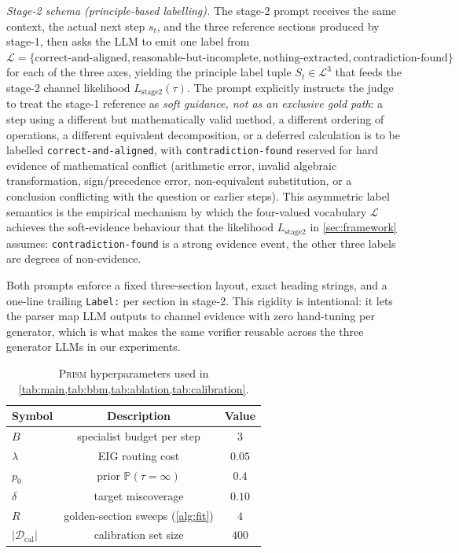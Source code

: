 \documentclass[11pt,a4paper]{article}
\newcommand{\Prob}{\mathbb{P}}
\newcommand{\Lcal}{\mathcal{L}}
\newcommand{\Dcal}{\mathcal{D}}
\theoremstyle{plain}
\theoremstyle{definition}
\theoremstyle{remark}
\begin{document}
\emph{Stage-2 schema (principle-based labelling).} The stage-2
prompt receives the same context, the actual next step $s_t$, and
the three reference sections produced by stage-1, then asks the LLM
to emit one label from
$\Lcal = \{\text{correct-and-aligned},
\text{reasonable-but-incomplete}, \text{nothing-extracted},
\text{contradiction-found}\}$
for each of the three axes, yielding the principle label tuple
$S_t \in \Lcal^3$ that feeds the stage-2 channel likelihood
$L_{\text{stage2}}(\tau)$. The prompt explicitly instructs the
judge to treat the stage-1 reference as \emph{soft guidance, not as
an exclusive gold path}: a step using a different but
mathematically valid method, a different ordering of operations, a
different equivalent decomposition, or a deferred calculation is to
be labelled \texttt{correct-and-aligned}, with
\texttt{contradiction-found} reserved for hard evidence of
mathematical conflict (arithmetic error, invalid algebraic
transformation, sign/precedence error, non-equivalent substitution,
or a conclusion conflicting with the question or earlier steps).
This asymmetric label semantics is the empirical mechanism by which
the four-valued vocabulary $\Lcal$ achieves the soft-evidence
behaviour that the likelihood $L_{\text{stage2}}$ in
\cref{sec:framework} assumes: \texttt{contradiction-found} is a
strong evidence event, the other three labels are degrees of
non-evidence.

Both prompts enforce a fixed three-section layout, exact heading
strings, and a one-line trailing \texttt{Label:} per section in
stage-2. This rigidity is intentional: it lets the parser map LLM
outputs to channel evidence with zero hand-tuning per generator,
which is what makes the same verifier reusable across the three
generator LLMs in our experiments.

\begin{table}[t]
\centering
\caption{\textsc{Prism} hyperparameters used in
\cref{tab:main,tab:bbm,tab:ablation,tab:calibration}.}
\label{tab:hparams}
\small
\begin{tabular}{lcc}
\toprule
Symbol & Description & Value \\
\midrule
$B$ & specialist budget per step & $3$ \\
$\lambda$ & EIG routing cost & $0.05$ \\
$p_0$ & prior $\Prob(\tau{=}\infty)$ & $0.4$ \\
$\delta$ & target miscoverage & $0.10$ \\
$R$ & golden-section sweeps (\cref{alg:fit}) & $4$ \\
$|\Dcal_{\mathrm{cal}}|$ & calibration set size & $400$ \\
\bottomrule
\end{tabular}
\end{table}
\end{document}
